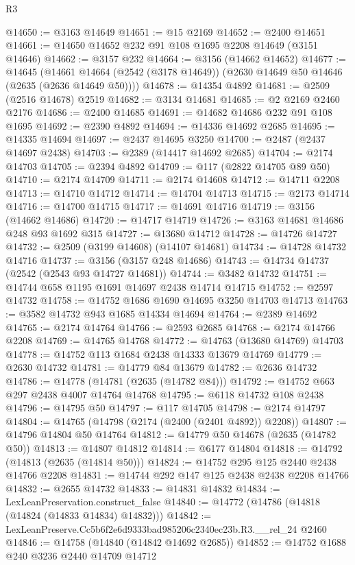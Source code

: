 \begin{lexlean}{R3}
\begin{coremodule}
@14650 := @3163 @14649
@14651 := @15 @2169
@14652 := @2400 @14651
@14661 := @14650 @14652 @232 @91 @108 @1695 @2208 @14649 (@3151 @14646)
@14662 := @3157 @232
@14664 := @3156 (@14662 @14652)
@14677 := @14645
    (@14661 @14664 (@2542 (@3178 @14649)) (@2630 @14649 @50 @14646 (@2635 (@2636 @14649 @50))))
@14678 := @14354 @4892
@14681 := @2509 (@2516 @14678) @2519
@14682 := @3134 @14681
@14685 := @2 @2169 @2460 @2176
@14686 := @2400 @14685
@14691 := @14682 @14686 @232 @91 @108 @1695
@14692 := @2390 @4892
@14694 := @14336 @14692 @2685
@14695 := @14335 @14694
@14697 := @2437 @14695 @3250
@14700 := @2487 (@2437 @14697 @2438)
@14703 := @2389 (@14417 @14692 @2685)
@14704 := @2174 @14703
@14705 := @2394 @4892
@14709 := @117 (@2822 @14705 @89 @50)
@14710 := @2174 @14709
@14711 := @2174 @14608
@14712 := @14711 @2208
@14713 := @14710 @14712
@14714 := @14704 @14713
@14715 := @2173 @14714
@14716 := @14700 @14715
@14717 := @14691 @14716
@14719 := @3156 (@14662 @14686)
@14720 := @14717 @14719
@14726 := @3163 @14681 @14686 @248 @93 @1692 @315
@14727 := @13680 @14712
@14728 := @14726 @14727
@14732 := @2509 (@3199 @14608) (@14107 @14681)
@14734 := @14728 @14732 @14716
@14737 := @3156 (@3157 @248 @14686)
@14743 := @14734 @14737 (@2542 (@2543 @93 @14727 @14681))
@14744 := @3482 @14732
@14751 := @14744 @658 @1195 @1691 @14697 @2438 @14714 @14715
@14752 := @2597 @14732
@14758 := @14752 @1686 @1690 @14695 @3250 @14703 @14713
@14763 := @3582 @14732 @943 @1685 @14334 @14694
@14764 := @2389 @14692
@14765 := @2174 @14764
@14766 := @2593 @2685
@14768 := @2174 @14766 @2208
@14769 := @14765 @14768
@14772 := @14763 (@13680 @14769) @14703
@14778 := @14752 @113 @1684 @2438 @14333 @13679 @14769
@14779 := @2630 @14732
@14781 := @14779 @84 @13679
@14782 := @2636 @14732
@14786 := @14778 (@14781 (@2635 (@14782 @84)))
@14792 := @14752 @663 @297 @2438 @4007 @14764 @14768
@14795 := @6118 @14732 @108 @2438
@14796 := @14795 @50
@14797 := @117 @14705
@14798 := @2174 @14797
@14804 := @14765 (@14798 (@2174 (@2400 (@2401 @4892)) @2208))
@14807 := @14796 @14804 @50 @14764
@14812 := @14779 @50 @14678 (@2635 (@14782 @50))
@14813 := @14807 @14812
@14814 := @6177 @14804
@14818 := @14792 (@14813 (@2635 (@14814 @50)))
@14824 := @14752 @295 @125 @2440 @2438 @14766 @2208
@14831 := @14744 @292 @147 @125 @2438 @2438 @2208 @14766
@14832 := @2655 @14732
@14833 := @14831 @14832
@14834 := LexLeanPreservation.construct_false
@14840 := @14772 (@14786 (@14818 (@14824 (@14833 @14834) @14832)))
@14842 := LexLeanPreserve.Cc5b6f2e6d9333bad985206c2340ec23b.R3.__rel_24 @2460
@14846 := @14758 (@14840 (@14842 @14692 @2685))
@14852 := @14752 @1688 @240 @3236 @2440 @14709 @14712

\end{coremodule}
\end{lexlean}
